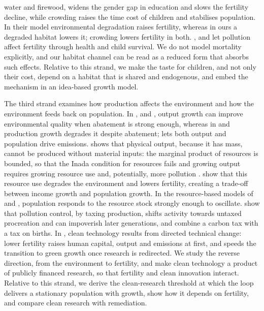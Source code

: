 \documentclass[11pt]{article}
\begin{document}
water and firewood, widens the gender gap in education and slows the fertility decline, while crowding
raises the time cost of children and stabilises population. In their model environmental degradation
raises fertility, whereas in ours a degraded habitat lowers it; crowding lowers fertility in both.
\citet{mari10}, \citet{Varvarigos2013} and
\citet{schaefer2020} let pollution affect fertility through health and child survival. We do not model
mortality explicitly, and our habitat channel can be read as a reduced form that absorbs such effects.
Relative to this
strand, we make the taste for children, and not only their cost, depend on a habitat that is shared and
endogenous, and embed the mechanism in an idea-based growth model.

The third strand examines how production affects the environment and how the environment feeds back on
population. In \citet{raffin14}, \citet{econ2008} and \citet{marsiglio2018}, output growth can improve
environmental quality when abatement is strong enough, whereas in \citet{Varvarigos2013} and
\citet{pautrel08} production growth degrades it despite abatement; \citet{mar2017} lets both output and
population drive emissions. \citet{DZHUMASHEV2024} shows that physical output, because it has mass, cannot
be produced without material inputs: the marginal product of resources is bounded, so that the Inada
condition for resources fails and growing output requires growing resource use and, potentially, more
pollution \citep[see also][]{baum04}. \citet{dzhumashev2025} show that this resource use degrades the
environment and lowers fertility, creating a trade-off between income growth and population growth.
In the resource-based models of \citet{Brander1998} and \citet{lagerlof2006}, population responds to
the resource stock strongly enough to oscillate.
\citet{DELACROIX2012271} show that pollution control, by taxing production, shifts activity towards
untaxed procreation and can impoverish later generations, and \citet{gerlagh2023} combine a carbon tax
with a tax on births. In \citet{beulmann2025}, clean technology results from
directed technical change: lower fertility raises human capital, output and emissions at first, and
speeds the transition to green growth once research is redirected. We study the reverse direction, from
the environment to fertility, and make clean technology a product of publicly financed research, so that
fertility and clean innovation interact. Relative to this strand, we derive the clean-research threshold
at which the loop delivers a stationary population with growth, show how it depends on fertility, and
compare clean research with remediation.
\end{document}
